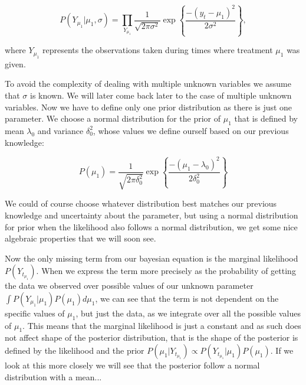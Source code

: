 \documentclass[12pt,a4paper,leqno]{report}
\theoremstyle{plain}
\theoremstyle{definition}
\theoremstyle{remark}
\begin{document}
\begin{def}\label{}
    \begin{equation}\label{}
        P(Y_{\mu_1}|\mu_1, \sigma)
        =
        \prod_{Y_{\mu_1}}
        \frac{1}
        {{\sqrt {2\pi \sigma^2} }}
        \exp{
            \left \{
            \frac{-(y_t - \mu_1)^2}
            {2\sigma^2}
            \right \}
        },
    \end{equation}
\end{def}where \(Y_{\mu_1}\) represents the observations taken during times where treatment \(\mu_1\)
was given.

To avoid the complexity of dealing with multiple unknown variables we assume
that \(\sigma \) is known. We will later come back later to the case of multiple unknown variables.
Now we have to define only one prior distribution as there is just one parameter.
We choose a normal distribution for the prior of \(\mu_1\) that is defined by mean \(\lambda_0 \)
and variance \(\delta_0^2 \), whose values we define ourself based on
our previous knowledge:

\begin{def}\label{}
    \begin{equation}\label{}
        P(\mu_1)
        =
        \frac{1}
        {{\sqrt {2\pi \delta_0^2} }}
        \exp{
            \left \{
            \frac{
                -(\mu_1 - \lambda_0)^2
            }
            {2\delta_0^2}
            \right \}
        }
    \end{equation}
\end{def}

We could of course choose whatever distribution best
matches our previous knowledge and uncertainty about the parameter,
but using a normal distribution for prior when the likelihood also follows a normal distribution,
we get some nice algebraic properties that we will soon see.

Now the only missing term from our bayesian equation is the marginal likelihood \(P(Y_{t_{\mu_1}}) \).
When we express the term more precisely as the probability of getting the data we observed
over possible values of our unknown parameter \(\int P(Y_{\mu_1}|\mu_1)P(\mu_1) d\mu_1 \),
we can see that the term is not dependent on the specific values of \(\mu_1 \), but just the data,
as we integrate over all the possible values of \(\mu_1 \).
This means that the marginal likelihood is just a constant and as such does not affect shape of the posterior distribution,
that is the shape of the posterior is defined by the likelihood and the prior
\(P(\mu_1|Y_{t_{\mu_1}}) \propto P(Y_{t_{\mu_1}}|\mu_1)P(\mu_1) \). If we look at this more
closely we will see that the posterior follow a normal distribution with a mean...
\end{document}
